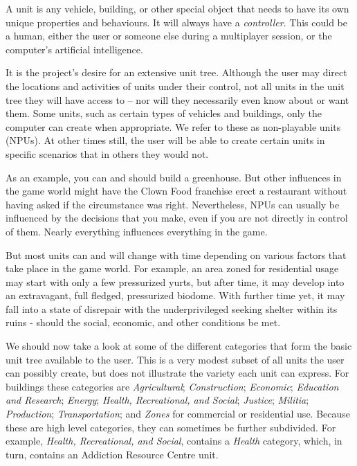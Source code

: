 

A unit is any vehicle, building, or other special object that needs to have its own unique properties and behaviours. It will always have a {\it controller}. This could be a human, either the user or someone else during a multiplayer session, or the computer's artificial intelligence.

It is the project's desire for an extensive unit tree. Although the user may direct the locations and activities of units under their control, not all units in the unit tree they will have access to -- nor will they necessarily even know about or want them. Some units, such as certain types of vehicles and buildings, only the computer can create when appropriate. We refer to these as non-playable units (NPUs). At other times still, the user will be able to create certain units in specific scenarios that in others they would not.

As an example, you can and should build a greenhouse. But other influences in the game world might have the Clown Food franchise erect a restaurant without having asked if the circumstance was right. Nevertheless, NPUs can usually be influenced by the decisions that you make, even if you are not directly in control of them. Nearly everything influences everything in the game.

But most units can and will change with time depending on various factors that take place in the game world. For example, an area zoned for residential usage may start with only a few pressurized yurts, but after time, it may develop into an extravagant, full fledged, pressurized biodome. With further time yet, it may fall into a state of disrepair with the underprivileged seeking shelter within its ruins - should the social, economic, and other conditions be met.

We should now take a look at some of the different categories that form the basic unit tree available to the user. This is a very modest subset of all units the user can possibly create, but does not illustrate the variety each unit can express. For buildings these categories are {\it Agricultural}; {\it Construction}; {\it Economic}; {\it Education and Research}; {\it Energy}; {\it Health, Recreational, and Social}; {\it Justice}; {\it Militia}; {\it Production}; {\it Transportation}; and {\it Zones} for commercial or residential use. Because these are high level categories, they can sometimes be further subdivided. For example, {\it Health, Recreational, and Social}, contains a {\it Health} category, which, in turn, contains an Addiction Resource Centre unit.

